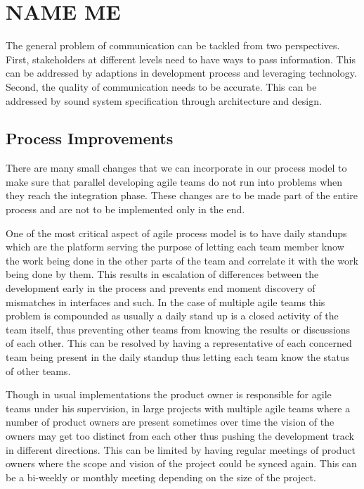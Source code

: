 \section{NAME ME} 
The general problem of communication can be tackled from two perspectives.
First, stakeholders at different levels need to have ways to pass information.
This can be addressed by adaptions in development process and leveraging technology.
Second, the quality of communication needs to be accurate.
This can be addressed by sound system specification through architecture and design.

\subsection{Process Improvements} 
\label{sec:proc_impv}
	There are many small changes \cite{collabAcrossAgile_article} that we can incorporate in our process model to make sure that parallel developing agile teams do not run into problems when they reach the integration phase.
	These changes are to be made part of the entire process and are not to be implemented only in the end.

	One of the most critical aspect of agile process model is to have daily standups which are the platform serving the purpose of letting each team member know the work being done in the other parts of the team and correlate it with the work being done by them.
	This results in escalation of differences between the development early in the process and prevents end moment discovery of mismatches in interfaces and such.
	In the case of multiple agile teams this problem is compounded as usually a daily stand up is a closed activity of the team itself, thus preventing other teams from knowing the results or discussions of each other.
	This can be resolved by having a representative of each concerned team being present in the daily standup thus letting each team know the status of other teams.

Though in usual implementations the product owner is responsible for agile teams under his supervision, in large projects with multiple agile teams where a number of product owners are present sometimes over time the vision of the owners may get too distinct from each other thus pushing the development track in different directions.
This can be limited by having regular meetings of product owners where the scope and vision of the project could be synced again. This can be a bi-weekly or monthly meeting depending on the size of the project.

